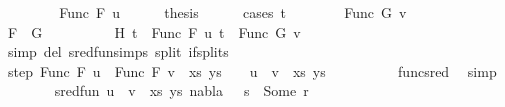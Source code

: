 \begin{isabellebody}
\ \ \isamarkupfalse%
\isanewline
\ \ \ \ \isamarkupfalse%
\ {\isacharparenleft}{\kern0pt}Func\ F\ u{\isacharparenright}{\kern0pt}\isanewline
\ \ \ \ \isamarkupfalse%
\ {\isacharquery}{\kern0pt}thesis\isanewline
\ \ \ \ \isamarkupfalse%
\ {\isacharparenleft}{\kern0pt}cases\ t{}{\isacharparenright}{\kern0pt}\isanewline
\ \ \ \ \ \ \isamarkupfalse%
\ {\isacharparenleft}{\kern0pt}Func\ G\ v{\isacharparenright}{\kern0pt}\isanewline
\ \ \ \ \ \ %
\isanewline
\ \ \ \ \ \ \isamarkupfalse%
\ {\isachardoublequoteopen}F\ {\isacharequal}{\kern0pt}\ G{\isachardoublequoteclose}\isanewline
\ \ \ \ \ \ \ \ \isamarkupfalse%
\ H\ {\isacartoucheopen}t{}\ {\isacharequal}{\kern0pt}\ Func\ F\ u{\isacartoucheclose}\ {\isacartoucheopen}t{}\ {\isacharequal}{\kern0pt}\ Func\ G\ v{\isacartoucheclose}\ \isamarkupfalse%
\ {\isacharparenleft}{\kern0pt}simp\ del{\isacharcolon}{\kern0pt}\ sred{\isacharunderscore}{\kern0pt}fun{\isachardot}{\kern0pt}simps\ split{\isacharcolon}{\kern0pt}\ if{\isacharunderscore}{\kern0pt}splits{\isacharparenright}{\kern0pt}\isanewline
\ \ \ \ \ \ \isamarkupfalse%
\ step{\isacharcolon}{\kern0pt}\ {\isachardoublequoteopen}{\isacharparenleft}{\kern0pt}{\isacharparenleft}{\kern0pt}Func\ F\ u\ {\isasymapprox}{\isacharquery}{\kern0pt}\ Func\ F\ v{\isacharparenright}{\kern0pt}\ {\isacharhash}{\kern0pt}\ xs{\isacharcomma}{\kern0pt}\ ys{\isacharparenright}{\kern0pt}\ {\isasymturnstile}\ {\isacharbrackleft}{\kern0pt}{\isacharbrackright}{\kern0pt}\ {\isasymleadsto}\ {\isacharparenleft}{\kern0pt}{\isacharparenleft}{\kern0pt}u\ {\isasymapprox}{\isacharquery}{\kern0pt}\ v{\isacharparenright}{\kern0pt}\ {\isacharhash}{\kern0pt}\ xs{\isacharcomma}{\kern0pt}\ ys{\isacharparenright}{\kern0pt}{\isachardoublequoteclose}\isanewline
\ \ \ \ \ \ \ \ \isamarkupfalse%
\ func{\isacharunderscore}{\kern0pt}sred\ \isamarkupfalse%
\ simp\isanewline
\ \ \ \ \ \ \isamarkupfalse%
\ {\isachardoublequoteopen}sred{\isacharunderscore}{\kern0pt}fun\ {\isacharparenleft}{\kern0pt}{\isacharparenleft}{\kern0pt}{\isacharparenleft}{\kern0pt}u\ {\isasymapprox}{\isacharquery}{\kern0pt}\ v{\isacharparenright}{\kern0pt}\ {\isacharhash}{\kern0pt}\ xs{\isacharcomma}{\kern0pt}\ ys{\isacharparenright}{\kern0pt}{\isacharcomma}{\kern0pt}\ nabla{\isacharcomma}{\kern0pt}\ {\isacharbrackleft}{\kern0pt}{\isacharbrackright}{\kern0pt}\ {\isasymbullet}\ s{\isacharparenright}{\kern0pt}\ {\isacharequal}{\kern0pt}\ Some\ r{\isachardoublequoteclose}\isanewline

\end{isabellebody}
